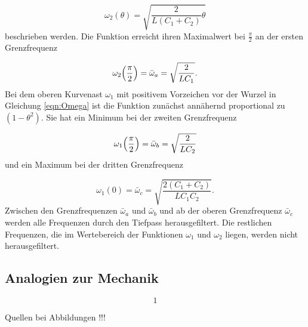 \begin{equation}
  \omega_2 (\theta) = \sqrt{\frac{2}{L(C_1 + C_2)} \theta}
\end{equation}
beschrieben werden.
Die Funktion erreicht ihren Maximalwert bei $\frac{\pi}{2}$ an
der ersten Grenzfrequenz

\begin{equation}
  \omega_2\Bigl(\frac{\pi}{2}\Bigr) = \bar{\omega}_a = \sqrt{\frac{2}{LC_1}}.
\end{equation}
Bei dem oberen Kurvenast $\omega_1$ mit positivem Vorzeichen vor der Wurzel in
Gleichung \eqref{eqn:Omega} ist die Funktion zunächst annähernd
proportional zu $(1-\theta^2)$.
Sie hat ein Minimum bei der zweiten Grenzfrequenz

\begin{equation}
  \omega_1\Bigl(\frac{\pi}{2}\Bigr) = \bar{\omega}_b = \sqrt{\frac{2}{LC_2}}
\end{equation}
und ein Maximum bei der dritten Grenzfrequenz

\begin{equation}
  \omega_1(0) = \bar{\omega}_c = \sqrt{\frac{2(C_1+C_2)}{LC_1C_2}}.
\end{equation}
Zwischen den Grenzfrequenzen $\bar{\omega}_a$ und $\bar{\omega}_b$ und ab der
oberen Grenzfrequenz $\bar{\omega}_c$ werden alle Frequenzen durch den
Tiefpass herausgefiltert. Die restlichen Frequenzen, die im Wertebereich der
Funktionen $\omega_1$ und $\omega_2$ liegen, werden nicht herausgefiltert.

\subsection{Analogien zur Mechanik}


\begin{equation}
1
\end{equation}

Quellen bei Abbildungen !!!


\cite{sample}
